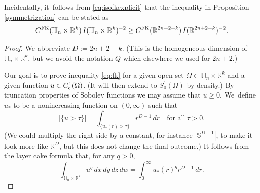 \documentclass[10pt]{amsart}
\newcommand{\rc}{\textup{c}}
\newcommand{\FK}{\textup{FK}}
\theoremstyle{definition}
\newcommand{\1}{\mathbbm{1}}
\newcommand{\R}{\mathbb{R}}
\newcommand{\Sph}{\mathbb{S}}
\begin{document}
Incidentally, it~follows from \eqref{eq:isofkexplicit} that the inequality in Proposition \ref{symmetrization} can be stated as
\begin{equation}
\label{eq:symmetrization}
C^\FK(\mathbb H_n\times\R^k)\,I(\mathbb H_n\times\R^k)^{-2} \geq
C^\FK(\R^{2n+2+k}) \,I(\mathbb R^{2n+2+k})^{-2}.
\end{equation}

\begin{proof}
We abbreviate $D := 2n+2+k$. (This is the homogeneous dimension of $\mathbb H_n\times\R^k$, but we avoid the notation $Q$ which elsewhere we used for $2n+2$.)

Our goal is to prove inequality \eqref{eq:fk} for a given open set $\Omega\subset\mathbb H_n\times\R^k$ and a given function $u\in C^1_\rc(\Omega)$. (It will then extend to $S^1_0(\Omega)$ by density.) By truncation properties of Sobolev functions we may assume that $u\geq 0$. We~define $u_*$ to be a nonincreasing function on $(0,\infty)$ such that
\[
|\{ u >\tau \}| = \int_{\{u_*(r)>\tau\}} r^{D-1}\,dr
\quad\text{for all}\ \tau>0.
\]
(We could multiply the right side by a constant, for instance $|\Sph^{D-1}|$, to make it look more like $\R^D$, but this does not change the final outcome.) It follows from the layer cake formula that, for any $q>0$,
\begin{equation}
\label{eq:layercake}
\int_{\mathbb H_n\times\R^k} u^q\,dx\,dy\,dz\,dw = \int_0^\infty u_*(r)^q r^{D-1}\,dr.
\end{equation}


\end{proof}
\end{document}
